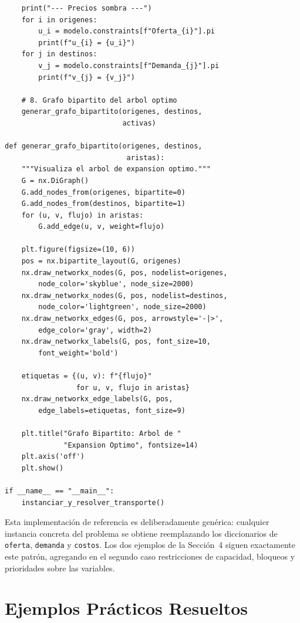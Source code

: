 \documentclass[10pt,letterpaper,twocolumn]{article}
\begin{document}
\begin{lstlisting}
    print("--- Precios sombra ---")
    for i in origenes:
        u_i = modelo.constraints[f"Oferta_{i}"].pi
        print(f"u_{i} = {u_i}")
    for j in destinos:
        v_j = modelo.constraints[f"Demanda_{j}"].pi
        print(f"v_{j} = {v_j}")

    # 8. Grafo bipartito del arbol optimo
    generar_grafo_bipartito(origenes, destinos,
                            activas)

def generar_grafo_bipartito(origenes, destinos,
                             aristas):
    """Visualiza el arbol de expansion optimo."""
    G = nx.DiGraph()
    G.add_nodes_from(origenes, bipartite=0)
    G.add_nodes_from(destinos, bipartite=1)
    for (u, v, flujo) in aristas:
        G.add_edge(u, v, weight=flujo)

    plt.figure(figsize=(10, 6))
    pos = nx.bipartite_layout(G, origenes)
    nx.draw_networkx_nodes(G, pos, nodelist=origenes,
        node_color='skyblue', node_size=2000)
    nx.draw_networkx_nodes(G, pos, nodelist=destinos,
        node_color='lightgreen', node_size=2000)
    nx.draw_networkx_edges(G, pos, arrowstyle='-|>',
        edge_color='gray', width=2)
    nx.draw_networkx_labels(G, pos, font_size=10,
        font_weight='bold')

    etiquetas = {(u, v): f"{flujo}"
                 for u, v, flujo in aristas}
    nx.draw_networkx_edge_labels(G, pos,
        edge_labels=etiquetas, font_size=9)

    plt.title("Grafo Bipartito: Arbol de "
              "Expansion Optimo", fontsize=14)
    plt.axis('off')
    plt.show()

if __name__ == "__main__":
    instanciar_y_resolver_transporte()
\end{lstlisting}

\noindent Esta implementación de referencia es deliberadamente genérica: cualquier instancia concreta del problema se obtiene reemplazando los diccionarios de \texttt{oferta}, \texttt{demanda} y \texttt{costos}. Los dos ejemplos de la Sección~4 siguen exactamente este patrón, agregando en el segundo caso restricciones de capacidad, bloqueos y prioridades sobre las variables.

\section{Ejemplos Prácticos Resueltos}
\end{document}
